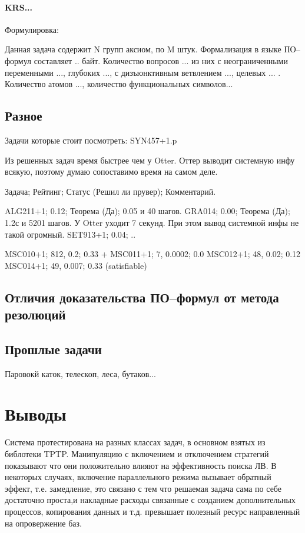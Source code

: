 \paragraph{KRS...}
Формулировка:

Данная задача содержит N групп аксиом, по M штук. Формализация в языке ПО--формул составляет .. байт. Количество вопросов ... из них с неограниченными переменными ..., глубоких ..., с дизъюнктивным ветвлением ..., целевых ... . Количество атомов ..., количество функциональных символов... 


\subsection{Разное}
Задачи которые стоит посмотреть:
SYN457+1.p

Из решенных задач время быстрее чем у Otter. Оттер выводит системную инфу всякую, поэтому думаю сопоставимо время на самом деле.

Задача; Рейтинг; Статус (Решил ли прувер); Комментарий.

ALG211+1; 0.12; Теорема (Да); 0.05 и 40 шагов.
GRA014; 0.00; Теорема (Да); 1.2с и 5201 шагов. У Otter уходит 7 секунд. При этом вывод системной инфы не такой огромный.
SET913+1; 0.04; ..


MSC010+1; 812, 0.2; 0.33 +
MSC011+1; 7, 0.0002; 0.0 
MSC012+1; 48, 0.02; 0.12
MSC014+1; 49, 0.007; 0.33 (satisfiable)

\subsection{Отличия доказательства ПО--формул от метода резолюций}



\subsection{Прошлые задачи}

Паровокй каток, телескоп, леса, бутаков...


\section{Выводы}
Система протестирована на разных классах задач, в основном взятых из библотеки TPTP. Манипуляцию с включением и отключением стратегий показывают что они положительно влияют на эффективность поиска ЛВ. В некоторых случаях, включение параллельного режима вызывает обратный эффект, т.е. замедление, это связано с тем что решаемая задача сама по себе достаточно проста,и  накладные расходы связанные с созданием дополнительных процессов, копирования данных и т.д. превышает полезный ресурс направленный на опровержение баз. 

